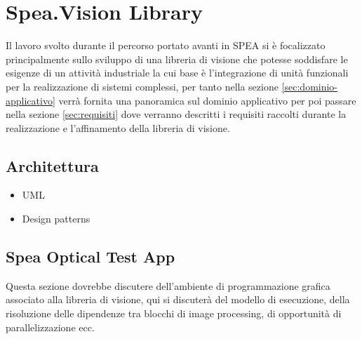 \chapter{Spea.Vision Library}
Il lavoro svolto durante il percorso portato avanti in SPEA si è focalizzato
principalmente sullo sviluppo di una libreria di visione che potesse
soddisfare le esigenze di un attività industriale la cui base è l'integrazione
di unità funzionali per la realizzazione di sistemi complessi, per tanto nella sezione \ref{sec:dominio-applicativo} verrà fornita una panoramica sul dominio applicativo per poi passare nella sezione \ref{sec:requisiti} dove verranno 
descritti i requisiti raccolti durante la realizzazione e l'affinamento della libreria di visione.









\section{Architettura}

\begin{itemize}
\item UML
\item Design patterns
\end{itemize}

\section{Spea Optical Test App}
Questa sezione dovrebbe discutere dell'ambiente di programmazione
grafica associato alla libreria di visione, qui si discuterà del
modello di esecuzione, della risoluzione delle dipendenze tra blocchi
di image processing, di opportunità di parallelizzazione ecc.

\endinput